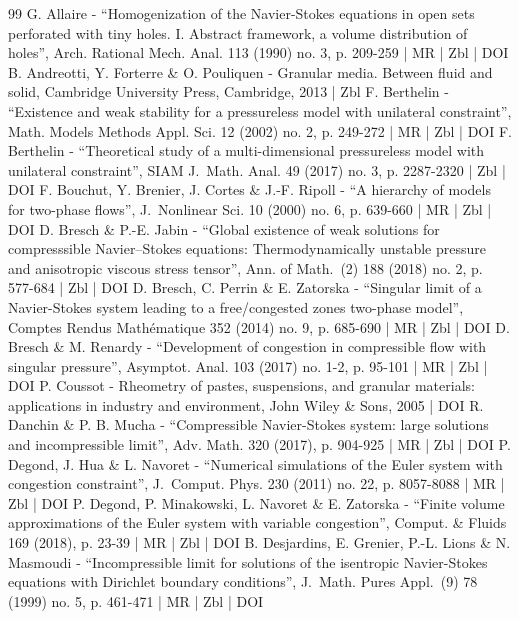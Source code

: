 \begin{thebibliography}{99}
G. Allaire - “Homogenization of the Navier-Stokes equations in open sets perforated with tiny holes. I. Abstract framework, a volume distribution of holes”, Arch. Rational Mech. Anal. 113 (1990) no. 3, p. 209-259 | MR | Zbl | DOI
B. Andreotti, Y. Forterre \& O. Pouliquen - Granular media. Between fluid and solid, Cambridge University Press, Cambridge, 2013 | Zbl
F. Berthelin - “Existence and weak stability for a pressureless model with unilateral constraint”, Math. Models Methods Appl. Sci. 12 (2002) no. 2, p. 249-272 | MR | Zbl | DOI
F. Berthelin - “Theoretical study of a multi-dimensional pressureless model with unilateral constraint”, SIAM J. Math. Anal. 49 (2017) no. 3, p. 2287-2320 | Zbl | DOI
F. Bouchut, Y. Brenier, J. Cortes \& J.-F. Ripoll - “A hierarchy of models for two-phase flows”, J. Nonlinear Sci. 10 (2000) no. 6, p. 639-660 | MR | Zbl | DOI
D. Bresch \& P.-E. Jabin - “Global existence of weak solutions for compresssible Navier–Stokes equations: Thermodynamically unstable pressure and anisotropic viscous stress tensor”, Ann. of Math. (2) 188 (2018) no. 2, p. 577-684 | Zbl | DOI
D. Bresch, C. Perrin \& E. Zatorska - “Singular limit of a Navier-Stokes system leading to a free/congested zones two-phase model”, Comptes Rendus Mathématique 352 (2014) no. 9, p. 685-690 | MR | Zbl | DOI
D. Bresch \& M. Renardy - “Development of congestion in compressible flow with singular pressure”, Asymptot. Anal. 103 (2017) no. 1-2, p. 95-101 | MR | Zbl | DOI
P. Coussot - Rheometry of pastes, suspensions, and granular materials: applications in industry and environment, John Wiley \& Sons, 2005 | DOI
R. Danchin \& P. B. Mucha - “Compressible Navier-Stokes system: large solutions and incompressible limit”, Adv. Math. 320 (2017), p. 904-925 | MR | Zbl | DOI
P. Degond, J. Hua \& L. Navoret - “Numerical simulations of the Euler system with congestion constraint”, J. Comput. Phys. 230 (2011) no. 22, p. 8057-8088 | MR | Zbl | DOI
P. Degond, P. Minakowski, L. Navoret \& E. Zatorska - “Finite volume approximations of the Euler system with variable congestion”, Comput. \& Fluids 169 (2018), p. 23-39 | MR | Zbl | DOI
B. Desjardins, E. Grenier, P.-L. Lions \& N. Masmoudi - “Incompressible limit for solutions of the isentropic Navier-Stokes equations with Dirichlet boundary conditions”, J. Math. Pures Appl. (9) 78 (1999) no. 5, p. 461-471 | MR | Zbl | DOI

\end{thebibliography}
